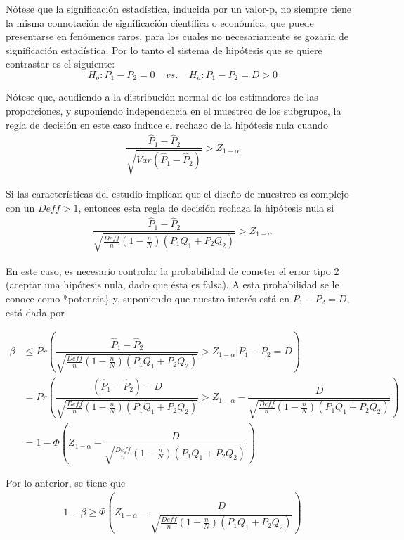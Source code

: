 \documentclass[
  10pt,
  spanish,
]{book}
\begin{document}
Nótese que la significación estadística, inducida por un valor-p, no siempre tiene la misma connotación de significación científica o económica, que puede presentarse en fenómenos raros, para los cuales no necesariamente se gozaría de significación estadística. Por lo tanto el sistema de hipótesis que se quiere contrastar es el siguiente:
\begin{equation*}
H_o: P_1-P_2=0 \ \ \ \ \ vs.  \ \ \ \ \ H_a: P_1 -P_2 =D > 0 
\end{equation*}

Nótese que, acudiendo a la distribución normal de los estimadores de las proporciones, y suponiendo independencia en el muestreo de los subgrupos, la regla de decisión en este caso induce el rechazo de la hipótesis nula cuando
\begin{align*}
\dfrac{\hat{P}_1-\hat{P}_2}{\sqrt{Var(\hat{P}_1-\hat{P}_2)}} > Z_{1-\alpha}
\end{align*}

Si las características del estudio implican que el diseño de muestreo es complejo con un \(Deff > 1\), entonces esta regla de decisión rechaza la hipótesis nula si
\begin{align*}
\dfrac{\hat{P}_1-\hat{P}_2}{\sqrt{\frac{Deff}{n}\left(1-\frac{n}{N}\right)(P_1Q_1+P_2Q_2)}} > Z_{1-\alpha}
\end{align*}

En este caso, es necesario controlar la probabilidad de cometer el error tipo 2 (aceptar una hipótesis nula, dado que ésta es falsa). A esta probabilidad se le conoce como *potencia\} y, suponiendo que nuestro interés está en \(P_1 -P_2 =D\), está dada por

\begin{align*}
\beta &\leq Pr\left(\dfrac{\hat{P}_1-\hat{P}_2}{\sqrt{\frac{Deff}{n}\left(1-\frac{n}{N}\right)(P_1Q_1+P_2Q_2)}} > Z_{1-\alpha} \left. | \right. P_1 -P_2 =D \right)\\
&= Pr\left(\dfrac{(\hat{P}_1-\hat{P}_2)-D}{\sqrt{\frac{Deff}{n}\left(1-\frac{n}{N}\right)(P_1Q_1+P_2Q_2)}} > Z_{1-\alpha} - \dfrac{D}{\sqrt{\frac{Deff}{n}\left(1-\frac{n}{N}\right)(P_1Q_1+P_2Q_2)}} \right)\\
&= 1-\Phi\left(Z_{1-\alpha} - \dfrac{D}{\sqrt{\frac{Deff}{n}\left(1-\frac{n}{N}\right)(P_1Q_1+P_2Q_2)}} \right)
\end{align*}

Por lo anterior, se tiene que
\begin{align*}
1-\beta \geq \Phi\left(Z_{1-\alpha} - \dfrac{D}{\sqrt{\frac{Deff}{n}\left(1-\frac{n}{N}\right)(P_1Q_1+P_2Q_2)}} \right)
\end{align*}
\end{document}
